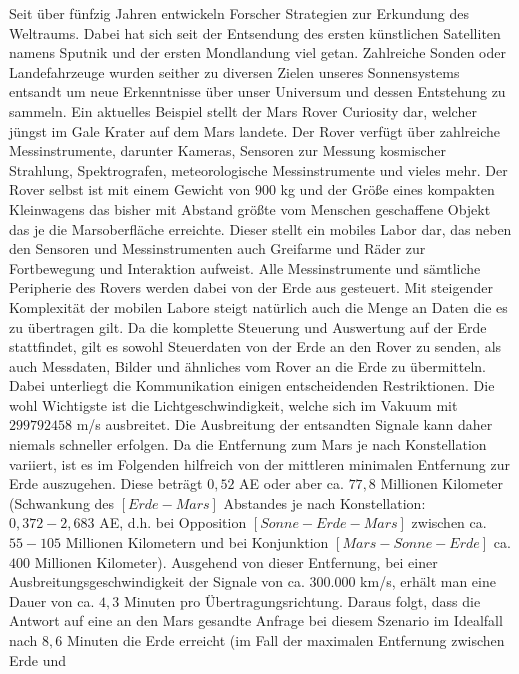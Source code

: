 Seit {\"u}ber f{\"u}nfzig Jahren entwickeln Forscher Strategien zur Erkundung
des Weltraums. Dabei hat sich seit der Entsendung des ersten k{\"u}nstlichen
Satelliten namens Sputnik und der ersten Mondlandung viel getan.
Zahlreiche Sonden oder Landefahrzeuge wurden seither zu diversen Zielen unseres
Sonnensystems entsandt um neue Erkenntnisse {\"u}ber unser Universum und dessen
Entstehung zu sammeln. Ein aktuelles Beispiel stellt der Mars Rover Curiosity
dar, welcher j{\"u}ngst im Gale Krater auf dem Mars landete. Der Rover
verf{\"u}gt {\"u}ber zahlreiche Messinstrumente, darunter Kameras, Sensoren zur
Messung kosmischer Strahlung, Spektrografen, meteorologische Messinstrumente und
vieles mehr. Der Rover selbst ist mit einem Gewicht von $900$ kg und der
Gr{\"o}{\ss}e eines kompakten Kleinwagens das bisher mit Abstand gr{\"o}{\ss}te
vom Menschen geschaffene Objekt das je die Marsoberfl{\"a}che erreichte.
Dieser stellt ein mobiles Labor dar, das neben den Sensoren und
Messinstrumenten auch Greifarme und R{\"a}der zur Fortbewegung und Interaktion
aufweist. Alle Messinstrumente und s{\"a}mtliche Peripherie des Rovers werden dabei von der
Erde aus gesteuert. Mit steigender Komplexit{\"a}t der mobilen Labore
steigt nat{\"u}rlich auch die Menge an Daten die es zu {\"u}bertragen gilt. Da
die komplette Steuerung und Auswertung auf der Erde stattfindet, gilt es sowohl
Steuerdaten von der Erde an den Rover zu senden, als auch Messdaten, Bilder und
{\"a}hnliches vom Rover an die Erde zu {\"u}bermitteln. Dabei unterliegt die
Kommunikation einigen entscheidenden Restriktionen. Die wohl Wichtigste ist die
Lichtgeschwindigkeit, welche sich im Vakuum mit $299 792 458$ m/s ausbreitet.
Die Ausbreitung der entsandten Signale kann daher niemals schneller erfolgen. Da die
Entfernung zum Mars je nach Konstellation variiert, ist es im Folgenden
hilfreich von der mittleren minimalen Entfernung zur Erde auszugehen. Diese
betr{\"a}gt $0,52$ AE oder aber ca. $77,8$ Millionen Kilometer (Schwankung des
$[Erde - Mars]$ Abstandes je nach Konstellation: $0,372 - 2,683$ AE, d.h. bei
Opposition $[Sonne - Erde - Mars]$ zwischen ca. $55 - 105$ Millionen Kilometern
und bei Konjunktion $[Mars - Sonne - Erde]$ ca. $400$ Millionen Kilometer).
Ausgehend von dieser Entfernung, bei einer Ausbreitungsgeschwindigkeit der
Signale von ca. $300.000$ km/s, erh{\"a}lt man eine Dauer von ca. $4,3$ Minuten
pro {\"U}bertragungsrichtung. Daraus folgt, dass die Antwort auf eine an den
Mars gesandte Anfrage bei diesem Szenario im Idealfall nach $8,6$
Minuten die Erde erreicht (im Fall der maximalen Entfernung zwischen Erde und
